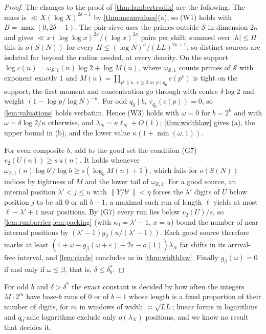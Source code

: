 \documentclass[11pt]{article}
\newcommand{\dist}[1]{\lVert #1\rVert}
\begin{document}
\begin{proof}
The changes to the proof of \cref{thm:lambertradix} are the following. The mass is
$\ll X(\log X)^{2\delta-1}$ by \cref{thm:meanvalues}(a), so (W1) holds with
$B=\max(0,2\delta-1)$. The pair sieve uses the primes outside $\mathcal S$ in dimension $2\kappa$
and gives $\ll x(\log\log x)^{2\kappa}/(\log x)^{2\kappa}$ pairs per shift; summed over
$|h|\le H$ this is $o(S(N))$ for every $H\le(\log N)^\kappa/(LL)^{2\kappa+1}$, so distinct
sources are isolated far beyond the radius needed, at every density. On the support
$\log c(n)=\omega_{\mathcal S,1}(n)\log2+\log M(n)$, where $\omega_{\mathcal S,1}$ counts primes of
$\mathcal S$ with exponent exactly $1$ and $M(n)=\prod_{p^e\|n,\,e\ge2\text{ or }p\mid q_0}c(p^e)$ is
tight on the support; the first moment and concentration go through with centre $\delta\log2$
and weight $(1-\log p/\log N)^{-\kappa}$. For odd $q_0\mid b$, $v_{q_0}(c(p))=0$, so
\cref{lem:valuations} holds verbatim. Hence (W3) holds with $\omega=0$ for $b=2^k$ and with
$\omega=\delta\log2/\kappa$ otherwise, and $\lambda_N=\kappa\ell_N+O(1)$; \cref{thm:widthlaw}
gives (a), the upper bound in (b), and the lower value $\kappa(1+\min(\omega,1))$.

For even composite $b$, add to the good set the condition (G7) $v_2(U(n))\ge s\,u(n)$. It holds
whenever $\omega_{\mathcal S,1}(n)\log b'/\log b\ge s(\log_bM(n)+1)$, which fails for $o(S(N))$
indices by tightness of $M$ and the lower tail of $\omega_{\mathcal S,1}$. For a good source,
an internal position $\lambda'<j\le u$ with $\dist{Y/b^j}<\eta$ forces the $\lambda'$ digits of
$U$ below position $j$ to be all $0$ or all $b-1$; a maximal such run of length $\ell$ yields at
most $\ell-\lambda'+1$ near positions. By (G7) every run lies below $v_2(U)/s$, so
\cref{lem:runbarrier,lem:packing} (with $\kappa_0=\lambda'-1$, $x=u$) bound the number of near
internal positions by $(\lambda'-1)g_\beta(u/(\lambda'-1))$. Each good source therefore marks at
least $(1+\omega-g_\beta(\omega+\varepsilon)-2\varepsilon-o(1))\lambda_N$ far shifts in its
arrival-free interval, and \cref{lem:circle} concludes as in \cref{thm:widthlaw}. Finally
$g_\beta(\omega)=0$ if and only if $\omega\le\beta$, that is, $\delta\le\delta_b^*$.
\end{proof}

For odd $b$ and $\delta>\delta^*$ the exact constant is decided by how often the integers
$M\cdot2^m$ have base-$b$ runs of $0$ or of $b-1$ whose length is a fixed proportion of their
number of digits, for $m$ in windows of width $\asymp\sqrt{LL}$; linear forms in logarithms and
$q_0$-adic logarithms exclude only $o(\lambda_N)$ positions, and we know no result that decides
it.
\end{document}
